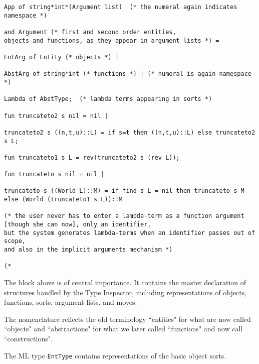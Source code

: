 \documentclass{article}
\begin{document}
\begin{verbatim}
App of string*int*(Argument list)  (* the numeral again indicates namespace *)

and Argument (* first and second order entities, 
objects and functions, as they appear in argument lists *) =

EntArg of Entity (* objects *) |

AbstArg of string*int (* functions *) | (* numeral is again namespace *)

Lambda of AbstType;  (* lambda terms appearing in sorts *)

fun truncateto2 s nil = nil |

truncateto2 s ((n,t,u)::L) = if s=t then ((n,t,u)::L) else truncateto2 s L;

fun truncateto1 s L = rev(truncateto2 s (rev L));

fun truncateto s nil = nil |

truncateto s ((World L)::M) = if find s L = nil then truncateto s M else (World (truncateto1 s L))::M

(* the user never has to enter a lambda-term as a function argument [though she can now], only an identifier, 
but the system generates lambda-terms when an identifier passes out of scope, 
and also in the implicit arguments mechanism *)

(*

\end{verbatim}

The block above is of central importance.  It contains the master declaration of structures handled by the Type Inspector, including representations of objects, functions, sorts, argument lists, and moves.

The nomenclature reflects the old terminology ``entities" for what are now called ``objects" and ``abstractions" for what we later called ``functions" and now call ``constructions".

The ML type {\tt EntType} contains representations of the basic object sorts.
\end{document}
